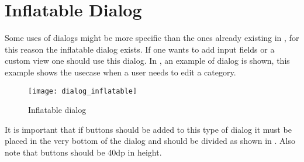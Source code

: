 \section{Inflatable Dialog}
\label{sec:inflatable_dialog}

Some uses of dialogs might be more specific than the ones already existing in \gc, for this reason the inflatable dialog exists. If one wants to add input fields or a custom view one should use this dialog. In , an example of dialog is shown, this example shows the usecase when a user needs to edit a category.

\begin{figure}[h]
	\centering
	\texttt{[image: dialog\_inflatable]}
	\caption{Inflatable dialog}
	\label{fig:inflatable_dialog}
\end{figure}
\FloatBarrier

\begin{note}
	It is important that if buttons should be added to this type of dialog it must be placed in the very bottom of the dialog and should be divided as shown in . Also note that buttons should be 40dp in height.
\end{note}





